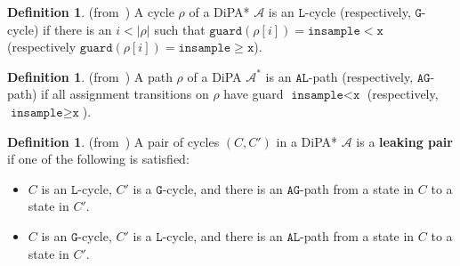 \documentclass[12pt]{article}
\newcommand{\gguard}{\texttt{insample}\geq \texttt{x}}
\newcommand{\lguard}{\texttt{insample} < \texttt{x}}
\theoremstyle{definition}
\newtheorem{defn}[thm]{Definition}
\begin{document}
\begin{defn} (from~\cite{chadhaLinearTimeDecidability2021}) A cycle $\rho$ of a DiPA* $\mathcal{A}$ is an $\texttt{L}$-cycle (respectively, $\texttt{G}$-cycle) if there is an $i < |\rho|$ such that $\texttt{guard}(\rho[i]) = \lguard$ (respectively $\texttt{guard}(\rho[i]) = \gguard$).
\end{defn}

\begin{defn} (from~\cite{chadhaLinearTimeDecidability2021}) A path $\rho$ of a DiPA $\mathcal{A}^*$ is an $\texttt{AL}$-path (respectively, $\texttt{AG}$-path) if all assignment transitions on $\rho$ have guard $\lguard$ (respectively, $\gguard$).
\end{defn}

\begin{defn} (from~\cite{chadhaLinearTimeDecidability2021})	
	A pair of cycles $(C, C')$ in a DiPA* $\mathcal{A}$ is a \textbf{leaking pair} if one of the following is satisfied:
	\begin{itemize}
		\item $C$ is an $\texttt{L}$-cycle, $C'$ is a $\texttt{G}$-cycle, and there is an $\texttt{AG}$-path from a state in $C$ to a state in $C'$.
		\item $C$ is an $\texttt{G}$-cycle, $C'$ is a $\texttt{L}$-cycle, and there is an $\texttt{AL}$-path from a state in $C$ to a state in $C'$.
	\end{itemize}
\end{defn}
\end{document}
